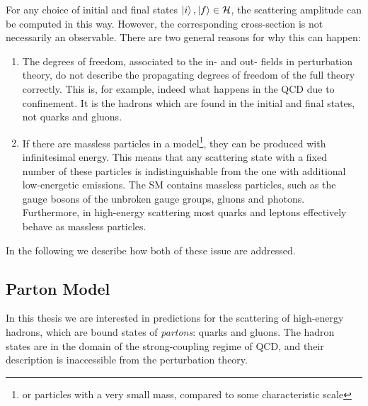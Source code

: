 For any choice of initial and final states $\ket{i},\ket{f} \in \mathcal{H}$, the scattering amplitude can be computed in this way.
However, the corresponding cross-section is not necessarily an observable. 
There are two general reasons for why this can happen:
\begin{enumerate}
  \item The degrees of freedom, associated to the in- and out- fields in perturbation theory, do not describe the propagating
    degrees of freedom of the full theory correctly. This is, for example, indeed what happens in the QCD due to confinement.
    It is the hadrons which are found in the initial and final states, not quarks and gluons.

  \item If there are massless particles in a model\footnote{or particles with a very small mass, compared to some characteristic scale}, they can be produced with infinitesimal energy.
    This means that any scattering state with a fixed number of these particles is indistinguishable from the one with additional low-energetic emissions.
    The SM contains massless particles, such as the gauge bosons of the unbroken gauge groups, gluons and photons.
    Furthermore, in high-energy scattering most quarks and leptons effectively behave as massless particles.
\end{enumerate}

In the following we describe how both of these issue are addressed.

\subsection{Parton Model}
\label{sec:partonmodel}

In this thesis we are interested in predictions for the scattering of high-energy hadrons,
which are bound states of \emph{partons}: quarks and gluons.
The hadron states are in the domain of the strong-coupling regime of QCD, 
and their description is inaccessible from the perturbation theory.

